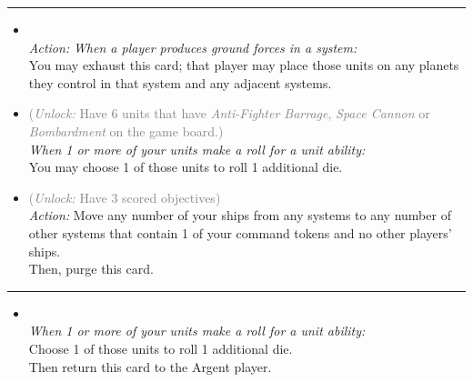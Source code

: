 \begin{multicols}{2}
\vspace{-10pt}\rule{\hsize}{0.4pt}\vspace{5pt}


\begin{itemize}
\item {}\\
\emph{Action:}
\emph{When a player produces ground forces in a system:}
\\
You may exhaust this card; that player may place those units on any planets they control in that system and any adjacent systems. 
\item {} \textcolor{gray}{(\emph{Unlock:} Have 6 units that have \emph{Anti-Fighter Barrage}, \emph{Space Cannon} or \emph{Bombardment} on the game board.)}\\
\emph{When 1 or more of your units make a roll for a unit ability:}
\\
You may choose 1 of those units to roll 1 additional die. 
\item {} \textcolor{gray}{(\emph{Unlock:} Have 3 scored objectives)}\\
\emph{Action:} Move any number of your ships from any systems to any number of other systems that contain 1 of your command tokens and no other players' ships.
\\
Then, purge this card. 
\end{itemize}

\vspace{-10pt}\rule{\hsize}{0.4pt}\vspace{5pt}


\begin{itemize}
\item {}\\
\emph{When 1 or more of your units make a roll for a unit ability:}\\
Choose 1 of those units to roll 1 additional die.
\\
Then return this card to the Argent player.
\end{itemize}

\end{multicols}



